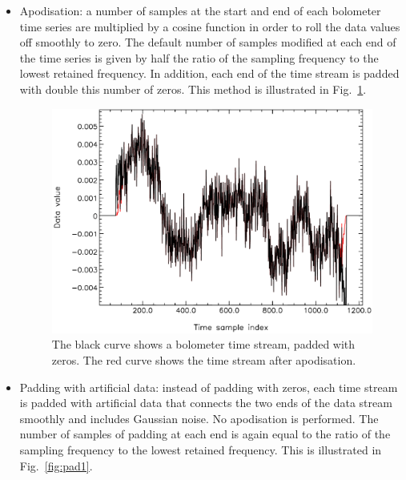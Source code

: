 \documentclass[useAMS,usenatbib,nofootinbib]{mn2e}
\begin{document}
\begin{itemize}
\item Apodisation: a number of samples at the start and end of each
bolometer time series are multiplied by a cosine function in order to
roll the data values off smoothly to zero. The default number of samples
modified at each end of the time series is given by half the ratio of the
sampling frequency to the lowest retained frequency. In addition, each
end of the time stream is padded with double this number of zeros. This
method is illustrated in Fig.~\ref{fig:pad2}.

\begin{figure}
\centering
\includegraphics[width=\linewidth]{pad2.pdf}
\caption{The black curve shows a bolometer time stream, padded
with zeros. The red curve shows the time stream after apodisation.}
\label{fig:pad2}
\end{figure}

\item Padding with artificial data: instead of padding with zeros, each
time stream is padded with artificial data that connects the two ends of
the data stream smoothly and includes Gaussian noise. No apodisation is
performed. The number of samples of padding at each end is again equal to
the ratio of the sampling frequency to the lowest retained frequency.
This is illustrated in Fig.~\ref{fig:pad1}.


\end{itemize}
\end{document}
